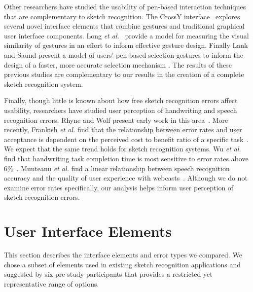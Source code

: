 \documentclass{egpubl}
\begin{document}


Other researchers have studied the usability of pen-based interaction
techniques that are complementary to sketch recognition.  The CrossY
interface~\cite{Apitz04CrossY} explores several novel interface
elements that combine gestures and traditional graphical user
interface components.  Long \textit{et
al.}~\cite{Long00VisualSimilarity} provide a model for measuring the
visual similarity of gestures in an effort to inform effective
gesture design.  Finally Lank and Saund present a model of users'
pen-based selection gestures to inform the design of a faster, more
accurate selection mechanism \cite{Lank2005Sloppy}.  The results of
these previous studies are complementary to our results in the
creation of a complete sketch recognition system.

Finally, though little is known about how free sketch recognition
errors affect usability, researchers have studied user perception of
handwriting and speech recognition errors.  Rhyne and Wolf present
early work in this area~\cite{Rhyne1993Recognition}.  More recently,
Frankish \textit{et al.} find that the relationship between error
rates and user acceptance is dependent on the perceived cost to
benefit ratio of a specific task~\cite{Frankish95RecogAccuracy}.  We
expect that the same trend holds for sketch recognition systems.  Wu
\textit{et al.}  find that handwriting task completion time is most
sensitive to error rates above 6\%~\cite{Wu03ChineseCharacterRecog}.
Munteanu \textit{et al.} find a linear relationship between speech
recognition accuracy and the quality of user experience with
webcasts~\cite{Munteanu2006Effect}.  Although we do not examine error
rates specifically, our analysis helps inform user perception of
sketch recognition errors.

\vspace{-0.02in}

\section{User Interface Elements}
This section describes the interface elements and error types we
compared.  We chose a subset of elements used in existing 
sketch recognition applications and suggested by six pre-study 
participants that provides a restricted yet representative range 
of options.
\end{document}

